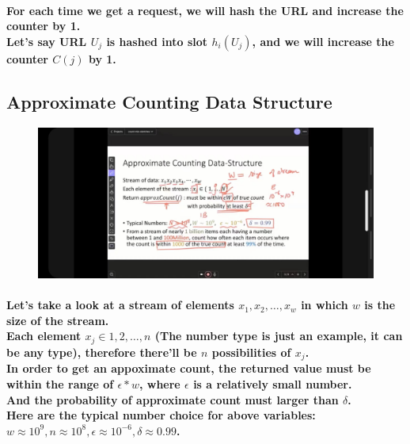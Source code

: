 \documentclass{article}
\begin{document}
\paragraph{
    For each time we get a request, we will hash the URL and increase the counter by 1.\\
    Let's say URL $U_j$ is hashed into slot $h_i(U_j)$, and we will increase the counter $C(j)$ by 1.\\
}

\subsection{Approximate Counting Data Structure}

\begin{figure}[H]
    \includegraphics[width=\textwidth]{appoximatecountingdatastructure.jpg}
\end{figure}

\paragraph{
    Let's take a look at a stream of elements ${x_1, x_2, \ldots ,x_w}$ in which $w$ is the size of the stream.\\
    Each element $x_j \in {1,2,\ldots,n}$ (The number type is just an example, it can be any type), 
    therefore there'll be $n$ possibilities of $x_j$.\\
    In order to get an appoximate count, the returned value must be within the range of $\epsilon*w$, where $\epsilon$
    is a relatively small number.\\
    And the probability of approximate count must larger than $\delta$.\\
    Here are the typical number choice for above variables:\\
    $w \approx 10^9,n \approx 10^8, \epsilon \approx 10^{-6}, \delta \approx 0.99$.\\
}
\end{document}
